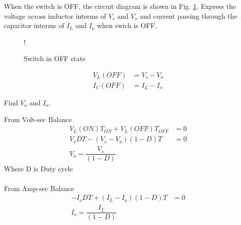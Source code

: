 \documentclass[journal,12pt,twocolumn]{IEEEtran}
\begin{document}
\begin{problem}
When the switch is OFF, the circuit diagram is shown in Fig. \ref{fig4}. Express the voltage across inductor interms of $V_{s}$ and $V_{o}$ and current passing through the capacitor interms of $I_{L}$ and $I_{o}$ when swich is OFF.  
\end{problem}
%
 \begin{figure}[!h]
       \centering  
\resizebox {\columnwidth} {!} {

} 
    \caption{Switch in OFF state}\label{fig4}
   \end{figure}
\solution
  \begin{align*}
  V_{L}(OFF) &=V_{s} -  V_{o}\\
  I_{C}(OFF) &= I_{L} - I_{o}
\end{align*}
\begin{problem}
Find $V_{o}$ and $I_{o}$.
\end{problem} 
\solution
From Volt-sec Balance
 \begin{align*}
  V_{L}(ON)T_{ON} + V_{L}(OFF)T_{OFF}&= 0 \\
  V_{s}D T- (V_{s} - V_{o})(1-D)T &= 0 \\
  V_{o} = \dfrac{V_{s}}{(1-D)}
\end{align*} 
Where D is Duty cycle\\ \\
From Amp-sec Balance
\begin{align*}
  - I_{o}D T+(I_{L}-I_{o})(1-D)T &= 0 \\
  I_{o} = \dfrac{I_{L}}{(1-D)}
\end{align*} 
\end{document}
